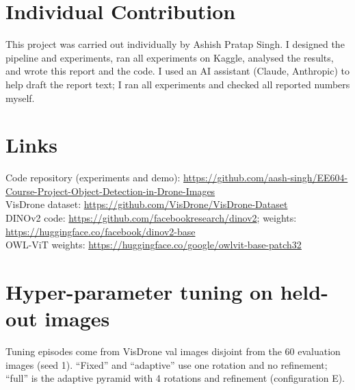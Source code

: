 \documentclass[10pt,twocolumn,letterpaper]{article}
\begin{document}
\section*{Individual Contribution}
This project was carried out individually by Ashish Pratap Singh. I designed the pipeline and experiments, ran all experiments on Kaggle, analysed the results, and wrote this report and the code. I used an AI assistant (Claude, Anthropic) to help draft the report text; I ran all experiments and checked all reported numbers myself.

\section*{Links}
\begingroup\raggedright\sloppy
\noindent Code repository (experiments and demo): \url{https://github.com/aash-singh/EE604-Course-Project-Object-Detection-in-Drone-Images}\\
VisDrone dataset: \url{https://github.com/VisDrone/VisDrone-Dataset}\\
DINOv2 code: \url{https://github.com/facebookresearch/dinov2}; weights: \url{https://huggingface.co/facebook/dinov2-base}\\
OWL-ViT weights: \url{https://huggingface.co/google/owlvit-base-patch32}
\endgroup

{\small


}

\clearpage
\appendix
\section{Hyper-parameter tuning on held-out images}
\label{app:tuning}
Tuning episodes come from VisDrone val images disjoint from the 60 evaluation images (seed 1). ``Fixed'' and ``adaptive'' use one rotation and no refinement; ``full'' is the adaptive pyramid with 4 rotations and refinement (configuration E).
\end{document}
